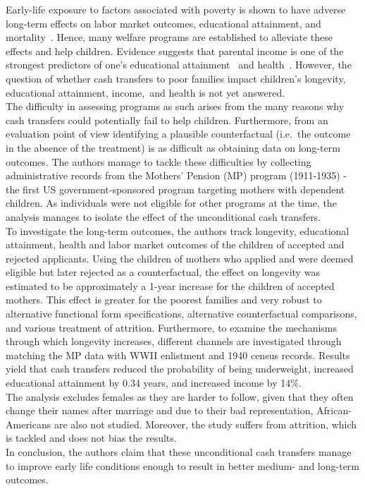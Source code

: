 Early-life exposure to factors associated with poverty is shown to have
adverse long-term effects on labor market outcomes, educational
attainment, and mortality~\citep{Almond_2011}. Hence, many welfare
programs are established to alleviate these effects and help children.
Evidence suggests that parental income is one of the strongest
predictors of one's educational attainment~\citep{Barrow_2012} and
health~\citep{Case_2002}. However, the question of whether cash
transfers to poor families impact children's longevity, educational
attainment, income,~and health is not yet answered.\\
The difficulty in assessing programs as such arises from the many
reasons why cash transfers could potentially fail to help children.
Furthermore, from an evaluation point of view identifying a plausible
counterfactual (i.e.~the outcome in the absence of the treatment) is as
difficult as obtaining data on long-term outcomes. The authors manage to
tackle these difficulties by collecting administrative records from the
Mothers' Pension (MP) program (1911-1935) - the first US
government-sponsored program targeting mothers with dependent children.
As individuals were not eligible for other programs at the time, the
analysis manages to isolate the effect of the unconditional cash
transfers.\\
To investigate the long-term outcomes, the authors track longevity, educational
attainment, health and labor market outcomes of the children of accepted
and rejected applicants. Using the children of mothers who applied and
were deemed eligible but later rejected as a counterfactual, the effect
on longevity was estimated to be approximately a 1-year increase for the
children of accepted mothers. This effect is greater for the poorest
families and very robust to alternative functional form specifications,
alternative counterfactual comparisons, and various treatment of attrition.
Furthermore, to examine the mechanisms through which longevity
increases, different channels are investigated through matching the MP
data with WWII enlistment and 1940 census records. Results yield that
cash transfers reduced the probability of being underweight, increased
educational attainment by 0.34 years, and increased income by 14\%.\\
The analysis excludes females as they are harder to follow, given that
they often change their names after marriage and due to their bad
representation, African-Americans are also not studied. Moreover, the
study suffers from attrition, which is tackled and does not bias the
results.\\
In conclusion, the authors claim that these unconditional cash transfers
manage to improve early life conditions enough to result in better medium- and
long-term outcomes.